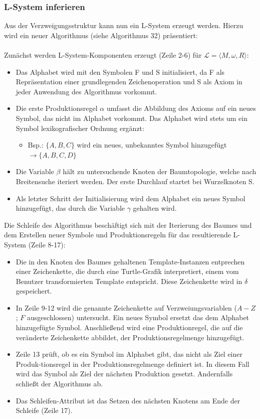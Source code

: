 \subsubsection*{L-System inferieren}
Aus der Verzweigungsstruktur kann nun ein L-System erzeugt werden.
Hierzu wird ein neuer Algorithmus (siehe Algorithmus 32) präsentiert:\\~\\
Zunächst werden L-System-Komponenten erzeugt (Zeile 2-6) für $\mathcal{L}=\langle M,\omega,R \rangle$:
\begin{itemize}
    \item Das Alphabet wird mit den Symbolen F und S initialisiert, da F als Repräsentation einer grundlegenden
    Zeichenoperation und S als Axiom in jeder Anwendung des Algorithmus vorkommt.
    \item Die erste Produktionsregel $\alpha$ umfasst die Abbildung des Axioms auf ein neues Symbol, das nicht im Alphabet
    vorkommt.
    Das Alphabet wird stets um ein Symbol lexikografischer Ordnung ergänzt:
    \begin{itemize}
        \item Bsp.: $\{A,B,C\}$ wird ein neues, unbekanntes Symbol hinzugefügt $\rightarrow \{A,B,C,D\}$
    \end{itemize}
    \item Die Variable $\beta$ hält zu untersuchende Knoten der Baumtopologie, welche nach Breitensuche iteriert werden.
    Der erste Durchlauf startet bei Wurzelknoten S.
    \item Als letzter Schritt der Initialisierung wird dem Alphabet ein neues Symbol hinzugefügt, das durch die Variable
    $\gamma$ gehalten wird.
\end{itemize}
Die Schleife des Algorithmus beschäftigt sich mit der Iterierung des Baumes und dem Erstellen neuer Symbole und
Produktionsregeln für das resultierende L-System (Zeile 8-17):
\begin{itemize}
    \item Die in den Knoten des Baumes gehaltenen Template-Instanzen entprechen einer Zeichenkette, die durch eine
    Turtle-Grafik interpretiert, einem vom Benutzer transformierten Template entspricht.
    Diese Zeichenkette wird in $\delta$ gespeichert.
    \item In Zeile 9-12 wird die genannte Zeichenkette auf Verzweiungsvariablen ($A-Z$; $F$ ausgeschlossen) untersucht.
    Ein neues Symbol ersetzt das dem Alphabet hinzugefügte Symbol. Anschließend wird eine Produktionregel,
    die auf die veränderte Zeichenkette abbildet, der Produktionsregelmenge hinzugefügt.
    \item Zeile 13 prüft, ob es ein Symbol im Alphabet gibt, das nicht als Ziel einer Produk-tionsregel in der Produktionsregelmenge
    definiert ist. In diesem Fall wird das Symbol als Ziel der nächsten Produktion gesetzt. Andernfalls schließt der Algorithmus ab.
    \item Das Schleifen-Attribut ist das Setzen des nächsten Knotens am Ende der Schleife (Zeile 17).
\end{itemize}

